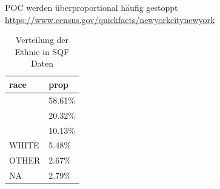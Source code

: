 \documentclass[aspectratio=169]{beamer}
\begin{document}
\begin{frame}{POC werden überproportional häufig gestoppt}
     \\
    \url{https://www.census.gov/quickfacts/newyorkcitynewyork}

    \vspace{0.3cm}  %

    \begin{table}
        \centering  %
		\caption{Verteilung der Ethnie in SQF Daten}
        \begin{tabular}{ll}
            \toprule
            race & prop \\
            \midrule
            \color{orange}{BLACK} & 58.61\% \\
            \color{orange}{WHITE HISPANIC} & 20.32\% \\
            \color{orange}{BLACK HISPANIC} & 10.13\% \\
            WHITE & 5.48\% \\
            OTHER & 2.67\% \\
            NA & 2.79\% \\
            \bottomrule
        \end{tabular}
    \end{table}
\end{frame}
\end{document}

